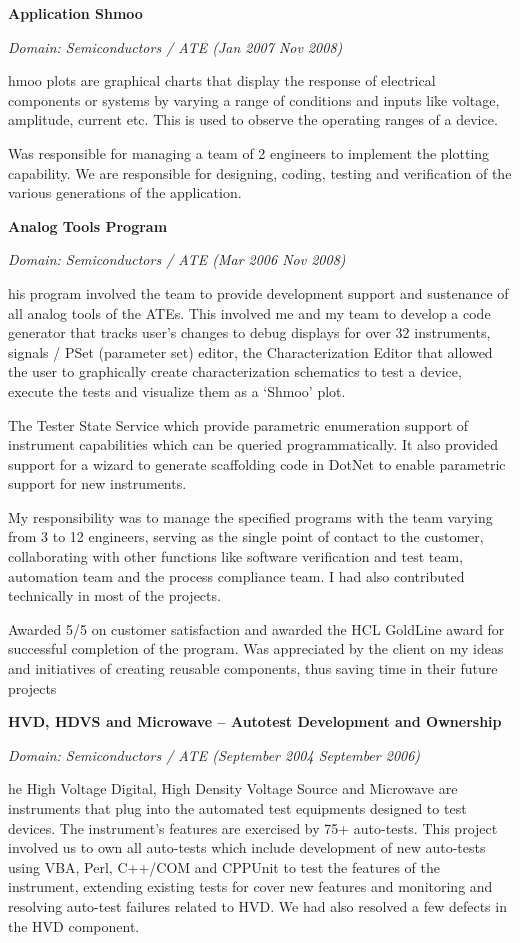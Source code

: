 \documentclass[a4paper,12pt]{article}
\newcommand\cvprojectentry[5]{
  \textbf{#1}
  
  \it{Domain: #2}\normalfont{} \quad (#3 \textendash #4)
  
}
\begin{document}
\cvprojectentry{Application Shmoo}{Semiconductors / ATE}{Jan 2007}{Nov 2008}

Shmoo plots are graphical charts that display the response of
electrical components or systems by varying a range of conditions and
inputs like voltage, amplitude, current etc. This is used to observe
the operating ranges of a device.
 
Was responsible for managing a team of 2 engineers to implement the
plotting capability. We are responsible for designing, coding, testing
and verification of the various generations of the application.
 
\cvprojectentry{Analog Tools Program}{Semiconductors / ATE}{Mar 2006}{Nov 2008}

This program involved the team to provide development support and
sustenance of all analog tools of the ATEs. This involved me and my
team to develop a code generator that tracks user's changes to debug
displays for over 32 instruments, signals / PSet (parameter set)
editor, the Characterization Editor that allowed the user to
graphically create characterization schematics to test a device,
execute the tests and visualize them as a `Shmoo' plot.

The Tester State Service which provide parametric enumeration support
of instrument capabilities which can be queried programmatically. It
also provided support for a wizard to generate scaffolding code in
DotNet to enable parametric support for new instruments.
 
My responsibility was to manage the specified programs with the team
varying from 3 to 12 engineers, serving as the single point of contact
to the customer, collaborating with other functions like software
verification and test team, automation team and the process compliance
team. I had also contributed technically in most of the projects.
 
Awarded 5/5 on customer satisfaction and awarded the HCL GoldLine
award for successful completion of the program. Was appreciated by the
client on my ideas and initiatives of creating reusable components,
thus saving time in their future projects
 
\cvprojectentry{HVD, HDVS and Microwave – Autotest Development and
  Ownership}{Semiconductors / ATE}{September 2004}{September 2006}

The High Voltage Digital, High Density Voltage Source and Microwave
are instruments that plug into the automated test equipments designed
to test devices. The instrument’s features are exercised by 75+
auto-tests. This project involved us to own all auto-tests which
include development of new auto-tests using VBA, Perl, C++/COM and
CPPUnit to test the features of the instrument, extending existing
tests for cover new features and monitoring and resolving auto-test
failures related to HVD. We had also resolved a few defects in the HVD
component.
 
\end{document}
